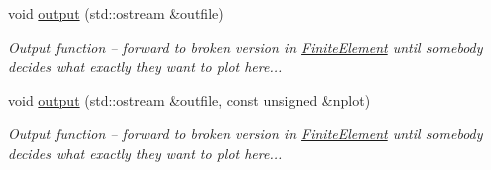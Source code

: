 \begin{DoxyCompactItemize}
void \hyperlink{classoomph_1_1SphericalAdvectionDiffusionFluxElement_a9ac365607431a072d3adc043cf057611}{output} (std\+::ostream \&outfile)
\begin{DoxyCompactList}\small\item\em Output function -- forward to broken version in \hyperlink{classoomph_1_1FiniteElement}{Finite\+Element} until somebody decides what exactly they want to plot here... \end{DoxyCompactList}\item 
void \hyperlink{classoomph_1_1SphericalAdvectionDiffusionFluxElement_a80df265285debfbfbffd4a48df4a2152}{output} (std\+::ostream \&outfile, const unsigned \&nplot)
\begin{DoxyCompactList}\small\item\em Output function -- forward to broken version in \hyperlink{classoomph_1_1FiniteElement}{Finite\+Element} until somebody decides what exactly they want to plot here... \end{DoxyCompactList}\end{DoxyCompactItemize}

